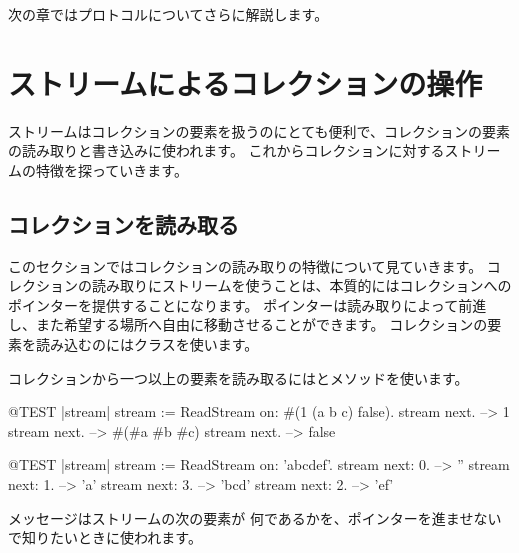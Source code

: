 \documentclass[a4paper,10pt,twoside]{book}
\begin{document}
次の章ではプロトコルについてさらに解説します。

\section{ストリームによるコレクションの操作}

ストリームはコレクションの要素を扱うのにとても便利で、コレクションの要素の読み取りと書き込みに使われます。
これからコレクションに対するストリームの特徴を探っていきます。


\subsection{コレクションを読み取る}

このセクションではコレクションの読み取りの特徴について見ていきます。
コレクションの読み取りにストリームを使うことは、本質的にはコレクションへのポインターを提供することになります。
ポインターは読み取りによって前進し、また希望する場所へ自由に移動させることができます。
コレクションの要素を読み込むのにはクラスを使います。

コレクションから一つ以上の要素を読み取るにはとメソッドを使います。

\begin{code}{@TEST |stream|}
stream := ReadStream on: #(1 (a b c) false).
stream next. -->   1
stream next. -->   #(#a #b #c)
stream next. -->   false
\end{code}

\begin{code}{@TEST |stream|}
stream := ReadStream on: 'abcdef'.
stream next: 0. -->   ''
stream next: 1. -->   'a'
stream next: 3. -->   'bcd'
stream next: 2. -->   'ef'
\end{code}

メッセージはストリームの次の要素が
何であるかを、ポインターを進ませないで知りたいときに使われます。

\noindent
\end{document}

